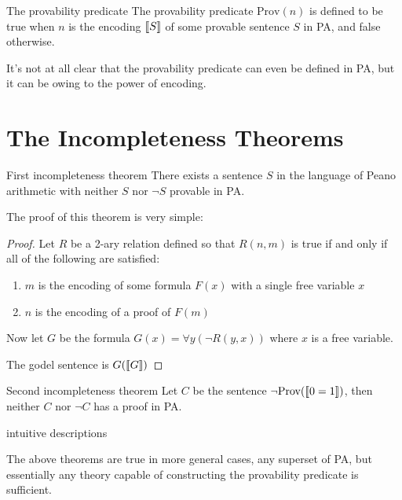 \documentclass[10pt]{article}
\DeclarePairedDelimiter{\enc}{[\![}{]\!]}
\newcommand{\prov}{\text{Prov}}
\begin{document}
	\begin{definition}{The provability predicate}{}
		The provability predicate $\prov(n)$ is defined to be true when $n$ is the encoding $\enc{S}$ of some provable sentence $S$ in PA, and false otherwise.
	\end{definition}
	
	It's not at all clear that the provability predicate can even be defined in PA, but it can be owing to the power of encoding.
	
	\section{The Incompleteness Theorems}
	
	\begin{theorem}{First incompleteness theorem}{}
		There exists a sentence $S$ in the language of Peano arithmetic with neither $S$ nor $\lnot S$ provable in PA.
	\end{theorem}

	The proof of this theorem is very simple:
	
	\begin{proof}
		Let $R$ be a 2-ary relation defined so that $R(n,m)$ is true if and only if all of the following are satisfied:
		\begin{enumerate}[itemsep=0pt]
			\item $m$ is the encoding of some formula $F(x)$ with a single free variable $x$
			\item $n$ is the encoding of a proof of $F(m)$
		\end{enumerate}
		
		\noindent Now let $G$ be the formula $G(x) = \forall y (\lnot R(y, x))$ where $x$ is a free variable.
		
		The godel sentence is $G(\enc{G})$ 
	\end{proof}

	\begin{theorem}{Second incompleteness theorem}{}
		Let $C$ be the sentence $\lnot\prov(\enc{0=1})$, then neither $C$ nor $\lnot C$ has a proof in PA.		
	\end{theorem}

	\begin{tcolorbox}[colback=red!5!white,colframe=red!75!black,title=TODO]
		intuitive descriptions
	\end{tcolorbox}

	The above theorems are true in more general cases, any superset of PA, but essentially any theory capable of constructing the provability predicate is sufficient.
	
\end{document}
